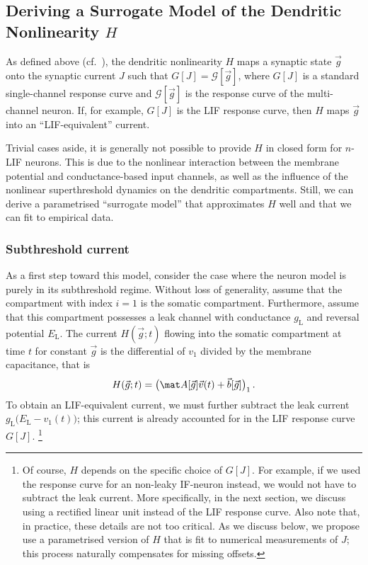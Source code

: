 \subsection{Deriving a Surrogate Model of the Dendritic Nonlinearity $H$}

As defined above (cf.~), the dendritic nonlinearity $H$ maps a synaptic state $\vec g$ onto the synaptic current $J$ such that $G[J] = \mathscr{G}[\vec g]$, where $G[J]$ is a standard single-channel response curve and $\mathscr{G}[\vec g]$ is the response curve of the multi-channel neuron.
If, for example, $G[J]$ is the LIF response curve, then $H$ maps $\vec g$ into an \enquote{LIF-equivalent} current.

Trivial cases aside, it is generally not possible to provide $H$ in closed form for $n$-LIF neurons.
This is due to the nonlinear interaction between the membrane potential and conductance-based input channels, as well as the influence of the nonlinear superthreshold dynamics on the dendritic compartments.
Still, we can derive a parametrised \enquote{surrogate model} that approximates $H$ well and that we can fit to empirical data.

\subsubsection{Subthreshold current}
As a first step toward this model, consider the case where the neuron model is purely in its subthreshold regime.
Without loss of generality, assume that the compartment with index $i = 1$ is the somatic compartment.
Furthermore, assume that this compartment possesses a leak channel with conductance $g_\mathrm{L}$ and reversal potential $E_\mathrm{L}$.
The current $H(\vec g; t)$ flowing into the somatic compartment at time $t$ for constant $\vec g$ is the differential of $v_1$ divided by the membrane capacitance, that is
\begin{align}
	H(\vec g; t) = \big(\mat A[\vec g] \vec v(t) + \vec b[\vec g] \big)_1 \,.
	\label{eqn:nlif_sub_momentary}
\end{align}
To obtain an LIF-equivalent current, we must further subtract the leak current $g_\mathrm{L} \big( E_\mathrm{L} - v_1(t) \big)$; this current is already accounted for in the LIF response curve $G[J]$.%
\footnote{
Of course, $H$ depends on the specific choice of $G[J]$.
For example, if we used the response curve for an non-leaky IF-neuron instead, we would not have to subtract the leak current.
More specifically, in the next section, we discuss using a rectified linear unit instead of the LIF response curve.
Also note that, in practice, these details are not too critical.
As we discuss below, we propose use a parametrised version of $H$ that is fit to numerical measurements of $J$; this process naturally compensates for missing offsets.
}

